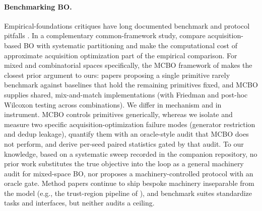 \documentclass[%
 aip,
 amsmath,amssymb,
 floatfix,
 reprint,%
]{revtex4-1}
\begin{document}
\paragraph{Benchmarking BO.}
Empirical-foundations critiques have long documented benchmark and
protocol pitfalls \cite{eggensperger2013towards, turner2021bayesian}.
In a complementary common-framework study, \citet{merrill2021acquisition}
compare acquisition-based BO with systematic partitioning and make the
computational cost of approximate acquisition optimization part of the
empirical comparison. For mixed and combinatorial spaces specifically, the MCBO framework of
\citet{dreczkowski2023mcbo} makes the closest prior argument to ours:
papers proposing a single primitive rarely benchmark against baselines
that hold the remaining primitives fixed, and MCBO supplies shared,
mix-and-match implementations (with Friedman and post-hoc Wilcoxon
testing across combinations). We differ in mechanism and in instrument.
MCBO controls primitives
generically, whereas we isolate and measure two specific
acquisition-optimization failure modes (generator restriction and dedup
leakage), quantify them with an oracle-style audit that MCBO does not
perform, and derive per-seed paired statistics gated by that audit. To
our knowledge, based on a systematic sweep recorded in the companion
repository, no prior work substitutes the true objective into the loop
as a general machinery audit for mixed-space BO, nor proposes a
machinery-controlled protocol with an oracle gate. Method papers
continue to ship bespoke machinery inseparable from the model (e.g., the
trust-region pipeline of \citet{papenmeier2023bounce}), and benchmark
suites standardize tasks and interfaces, but neither audits a ceiling.
\end{document}
